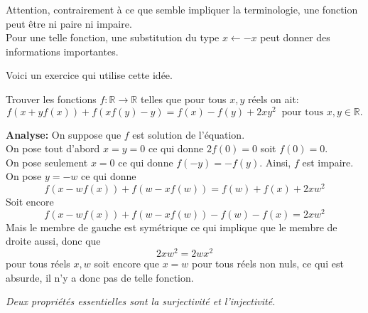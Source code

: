 \begin{rem}
Attention, contrairement à ce que semble impliquer la terminologie, une fonction peut être ni paire ni impaire.
\\
Pour une telle fonction, une substitution du type $x\gets-x$ peut donner des informations importantes.
\end{rem}

Voici un exercice qui utilise cette idée.



\begin{exo}[M]
Trouver les fonctions $f:\mathbb{R}\to \mathbb{R}$ telles que pour tous $x,y$ réels on ait:
$$f(x+yf(x)) +f(xf(y)-y) = f(x)-f(y)+2xy^2 \ \text{ pour tous } x, y \in \mathbb{R}.$$
\end{exo}
\begin{preuve}
\textbf{Analyse:} On suppose que $f$ est solution de l'équation.
\\
On pose tout d'abord $x=y=0$
ce qui donne $2f(0)=0$ soit $f(0)=0$.
\\
On pose seulement $x=0$ ce qui donne $f(-y)=-f(y)$. Ainsi, $f$ est impaire.
\\
On pose $y=-w$ ce qui donne $$f(x-wf(x))+f(w-xf(w))=f(w)+f(x)+2xw^2$$
Soit encore $$f(x-wf(x))+f(w-xf(w))-f(w)-f(x)=2xw^2$$
Mais le membre de gauche est symétrique ce qui implique que le membre de droite aussi, donc que $$2xw^2=2wx^2$$ pour tous réels $x,w$ soit encore que $x=w$ pour tous réels non nuls, ce qui est absurde, il n'y a donc pas de telle fonction. 
\end{preuve}

\emph{Deux propriétés essentielles sont la surjectivité et l'injectivité.}


